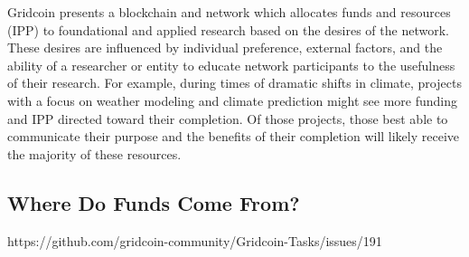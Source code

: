 Gridcoin presents a blockchain and network which allocates funds and resources (IPP) to foundational and applied research based on the desires of the network.  These desires are influenced by individual preference, external factors, and the ability of a researcher or entity to educate network participants to the usefulness of their research.  For example, during times of dramatic shifts in climate, projects with a focus on weather modeling and climate prediction might see more funding and IPP directed toward their completion.  Of those projects, those best able to communicate their purpose and the benefits of their completion will likely receive the majority of these resources.

\subsection{Where Do Funds Come From?}

https://github.com/gridcoin-community/Gridcoin-Tasks/issues/191